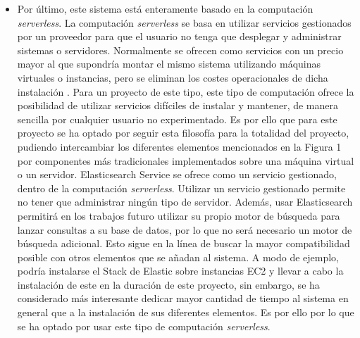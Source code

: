 \documentclass[../../memoria.tex]{subfiles}
\begin{document}
\begin{itemize}
    \item Por último, este sistema está enteramente basado en la computación \textit{serverless}. La computación \textit{serverless} se basa en utilizar servicios gestionados por un proveedor para que el usuario no tenga que desplegar y administrar sistemas o servidores. Normalmente se ofrecen como servicios con un precio mayor al que supondría montar el mismo sistema utilizando máquinas virtuales o instancias, pero se eliminan los costes operacionales de dicha instalación \cite{awsserverless}. Para un proyecto de este tipo, este tipo de computación ofrece la posibilidad de utilizar servicios difíciles de instalar y mantener, de manera sencilla por cualquier usuario no experimentado. Es por ello que para este proyecto se ha optado por seguir esta filosofía para la totalidad del proyecto, pudiendo intercambiar los diferentes elementos mencionados en la Figura 1 por componentes más tradicionales implementados sobre una máquina virtual o un servidor. Elasticsearch Service se ofrece como un servicio gestionado, dentro de la computación \textit{serverless}. Utilizar un servicio gestionado permite no tener que administrar ningún tipo de servidor. Además, usar Elasticsearch permitirá en los trabajos futuro utilizar su propio motor de búsqueda para lanzar consultas a su base de datos, por lo que no será necesario un motor de búsqueda adicional. Esto sigue en la línea de buscar la mayor compatibilidad posible con otros elementos que se añadan al sistema. A modo de ejemplo, podría instalarse el Stack de Elastic sobre instancias EC2 y llevar a cabo la instalación de este en la duración de este proyecto, sin embargo, se ha considerado más interesante dedicar mayor cantidad de tiempo al sistema en general que a la instalación de sus diferentes elementos. Es por ello por lo que se ha optado por usar este tipo de computación \textit{serverless}.
\end{itemize}
\end{document}

